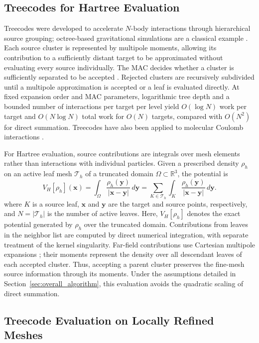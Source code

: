 \documentclass[a4paper,pdflatex,sn-mathphys-num]{sn-jnl}
\theoremstyle{thmstyleone}
\begin{document}
\subsection{Treecodes for Hartree Evaluation}
\label{subsec:treecode}

Treecodes were developed to accelerate $N$-body interactions through hierarchical source grouping; octree-based gravitational simulations are a classical example \cite{Appel1985,Barnes1986}. Each source cluster is represented by multipole moments, allowing its contribution to a sufficiently distant target to be approximated without evaluating every source individually. The MAC decides whether a cluster is sufficiently separated to be accepted \cite{Barnes1986,Dehnen2000}. Rejected clusters are recursively subdivided until a multipole approximation is accepted or a leaf is evaluated directly. At fixed expansion order and MAC parameters, logarithmic tree depth and a bounded number of interactions per target per level yield $O(\log N)$ work per target and $O(N\log N)$ total work for $O(N)$ targets, compared with $O(N^2)$ for direct summation. Treecodes have also been applied to molecular Coulomb interactions \cite{DuanKrasny2001}.

For Hartree evaluation, source contributions are integrals over mesh elements rather than interactions with individual particles. Given a prescribed density \(\rho_h\) on an active leaf mesh \(\mathcal T_h\) of a truncated domain \(\Omega\subset\mathbb R^3\), the potential is
\[
V_H[\rho_h](\mathbf x)
=\int_{\Omega}\frac{\rho_h(\mathbf y)}{|\mathbf x-\mathbf y|}\,d\mathbf y
=\sum_{K\in\mathcal T_h}
\int_K\frac{\rho_h(\mathbf y)}{|\mathbf x-\mathbf y|}\,d\mathbf y.
\]
where $K$ is a source leaf, $\mathbf x$ and $\mathbf y$ are the target and source points, respectively, and $N=|\mathcal T_h|$ is the number of active leaves. Here, $V_H[\rho_h]$ denotes the exact potential generated by $\rho_h$ over the truncated domain. Contributions from leaves in the neighbor list are computed by direct numerical integration, with separate treatment of the kernel singularity. Far-field contributions use Cartesian multipole expansions \cite{BeatsonGreengard1997,Cui}; their moments represent the density over all descendant leaves of each accepted cluster. Thus, accepting a parent cluster preserves the fine-mesh source information through its moments. Under the assumptions detailed in Section~\ref{sec:overall_algorithm}, this evaluation avoids the quadratic scaling of direct summation.

\subsection{Treecode Evaluation on Locally Refined Meshes}
\label{sec:interaction_list_review}
\end{document}
